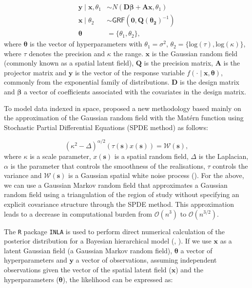 \documentclass{article}
\begin{document}
\begin{align}
\mathbf{y} \mid \mathbf{x}, \theta_{1} & \sim N(\boldsymbol{D\beta} + \mathbf{A} \mathbf{x}, \theta_{1}) \label{eqn:eq3}\\
\mathbf{x} \mid \theta_{2} & \sim \mathsf{GRF}(\boldsymbol{0}, \boldsymbol{Q(\theta_{2})}^{-1}) \label{eqn:eq4}\\
\boldsymbol{\theta} & = \{\theta_{1}, \theta_{2}\},\label{eqn:eq5}
\end{align}
where $\boldsymbol{\theta}$ is the vector of hyperparameters with $\theta_{1} = \sigma^{2}$, $\theta_{2} = \{\text{log}(\tau), \text{log}(\kappa)\}$, where $\tau$ denotes the precision and $\kappa$ the range.  $\boldsymbol{x}$ is the Gaussian random field (commonly known as a spatial latent field), $\boldsymbol{Q}$ is the precision matrix, $\boldsymbol{A}$ is the projector matrix and $\boldsymbol{y}$ is the vector of the response variable $f(\cdot \mid \boldsymbol{x}, \boldsymbol{\theta})$, commonly from the exponential family of distributions. $\boldsymbol{D}$ is the design matrix and $\boldsymbol{\beta}$ a vector of coefficients associated with the covariates in the design matrix. 

\vspace{0.2cm}


To model data indexed in space, \cite{lindgren2011explicit} proposed a new methodology based mainly on the approximation of the Gaussian random field with the Mat\'ern function using  Stochastic Partial Differential Equations (SPDE method) as follows:

\begin{equation}\label{eqn:eq9}
(\kappa^{2} - \Delta)^{\alpha/2}(\tau(\boldsymbol{s}) x(\boldsymbol{s})) = \boldsymbol{\mathcal{W}(s)},
\end{equation}
where $\kappa$ is a scale parameter, $x(\boldsymbol{s})$ is a spatial random field, $\Delta$ is the Laplacian, $\alpha$ is the parameter that controls the smoothness of the realisations, $\tau$ controls the variance and $\boldsymbol{\mathcal{W}(s)}$  is a Gaussian spatial white noise process (\cite{lindgren2015bayesian}). For the above, we can use a Gaussian Markov random field that approximates a Gaussian random field using a triangulation of the region of study without specifying an explicit covariance structure through the SPDE method. This approximation leads to a decrease in computational burden from $\mathcal{O}(n^{3})$ to $\mathcal{O}(n^{3/2})$.

The \texttt{R} package \texttt{INLA} is used to perform direct numerical calculation of the posterior distribution for a Bayesian hierarchical model (\cite{rue2009approximate}, \cite{martino2009implementing}). If we use $\boldsymbol{x}$ as a latent Gaussian field (a Gaussian Markov random field), $\boldsymbol{\theta}$ a vector of hyperparameters and $\boldsymbol{y}$ a vector of observations, assuming independent observations given the vector of the spatial latent field ($\boldsymbol{x}$) and the hyperparameters ($\boldsymbol{\theta}$), the likelihood can be expressed as:
\end{document}

